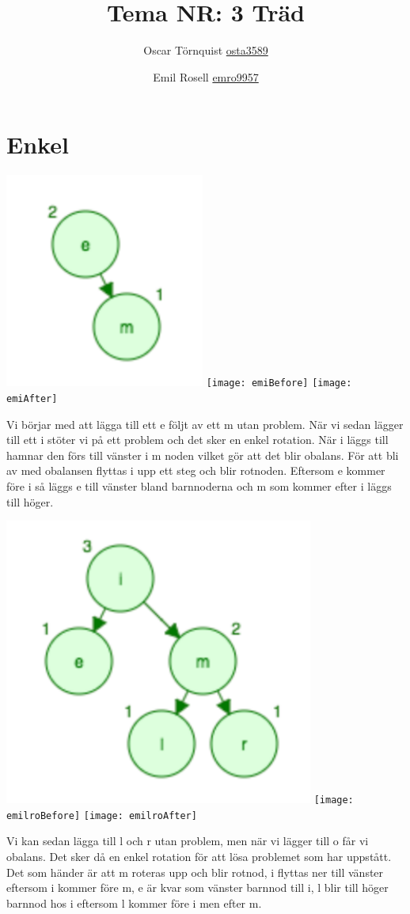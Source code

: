 \documentclass[a5paper,10pt,oneside]{article}
\title{Tema NR: 3 Träd}
\author{Oscar Törnquist \url{osta3589} \and Emil Rosell \url{emro9957}}
\begin{document}
\maketitle

\section*{Enkel}
\includegraphics[scale=0.7]{em}
\texttt{[image: emiBefore]}
\texttt{[image: emiAfter]}

Vi börjar med att lägga till ett e följt av ett m utan problem. När vi sedan lägger till ett i stöter vi på ett problem och det sker en enkel rotation. När i läggs till hamnar den förs till vänster i m noden vilket gör att det blir obalans. För att bli av med obalansen flyttas i upp ett steg och blir rotnoden. Eftersom e kommer före i så läggs e till vänster bland barnnoderna och m som kommer efter i läggs till höger. 

\includegraphics[scale=0.45]{emilr}
\texttt{[image: emilroBefore]}
\texttt{[image: emilroAfter]}

Vi kan sedan lägga till l och r utan problem, men när vi lägger till o får vi obalans. Det sker då en enkel rotation för att lösa problemet som har uppstått. Det som händer är att m roteras upp och blir rotnod, i flyttas ner till vänster eftersom i kommer före m, e är kvar som vänster barnnod till i, l blir till höger barnnod hos i eftersom l kommer före i men efter m. 
\end{document}
